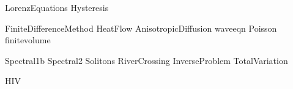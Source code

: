 \documentclass[nociteref]{SIAM-GH-book}
\begin{document}
{LorenzEquations}
{Hysteresis}

{FiniteDifferenceMethod}
{HeatFlow}
{AnisotropicDiffusion}
{waveeqn}
{Poisson}
{finitevolume}


{Spectral1b}
{Spectral2}
{Solitons}
{RiverCrossing}
{InverseProblem}
{TotalVariation}

{HIV}
\end{document}
